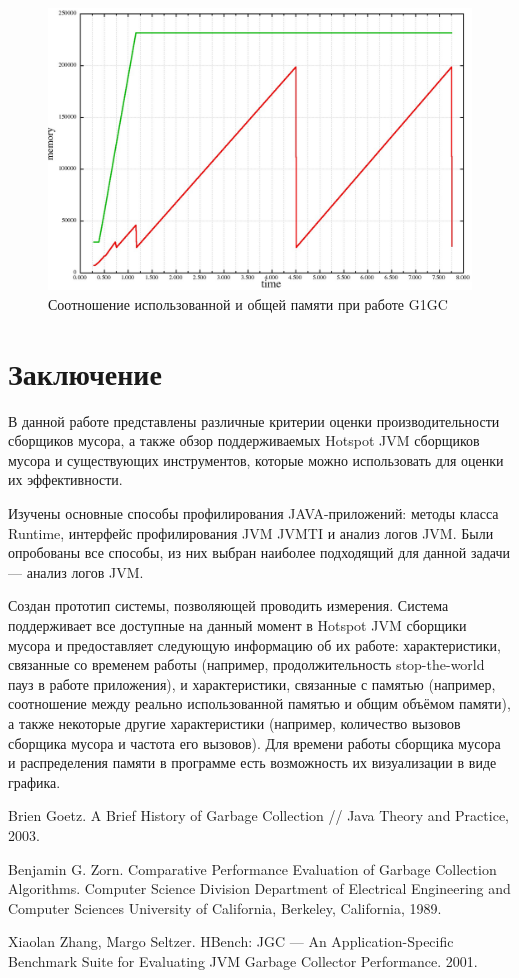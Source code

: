 \begin{figure}
\centering
\caption{\label{pic:g1mem}Соотношение использованной и общей памяти при работе G1GC}
\includegraphics[width=1\linewidth]{Bakradze/g1mem.jpg}
\end{figure}

\section*{Заключение}

В данной работе представлены различные критерии оценки производительности сборщиков мусора,
а также обзор поддерживаемых Hotspot JVM сборщиков мусора и существующих инструментов,
которые можно использовать для оценки их эффективности.

Изучены основные способы профилирования JAVA-приложений: методы класса Runtime, интерфейс
профилирования JVM JVMTI и анализ логов JVM. Были опробованы все способы,
из них выбран наиболее подходящий для данной задачи --- анализ логов JVM.

Создан прототип системы, позволяющей проводить измерения. Система поддерживает все доступные на данный
момент в Hotspot JVM сборщики мусора и предоставляет следующую информацию об их работе: характеристики, связанные
со временем работы (например, продолжительность stop-the-world пауз в работе приложения), и
характеристики, связанные с памятью (например, соотношение между реально использованной 
памятью и общим объёмом памяти), а также некоторые другие характеристики (например,
количество вызовов сборщика мусора и частота его вызовов). Для времени работы сборщика 
мусора и распределения памяти в программе есть возможность их визуализации в виде
графика.

\begin{thebibliography}{99}
Brien Goetz. A Brief History of Garbage Collection //
Java Theory and Practice, 2003.

Benjamin G. Zorn.
Comparative Performance Evaluation of Garbage Collection Algorithms.
Computer Science Division Department of Electrical Engineering and Computer Sciences University of California, Berkeley, California, 1989.

Xiaolan Zhang, Margo Seltzer.
HBench: JGC --- An Application-Specific Benchmark Suite for Evaluating JVM Garbage Collector Performance. 2001.
\end{thebibliography}
